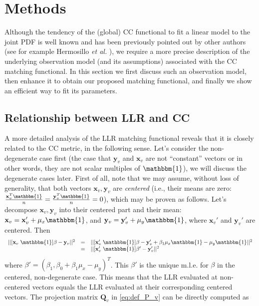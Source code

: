 \vspace{-0.5cm}
\section{Methods}
Although the tendency of the (global) CC functional to fit a linear model to the joint PDF is well known and has been previously pointed out by other authors (see for example Hermosillo {\it et al.} \cite{Hermosillo2004}), we require a more precise description of the underlying observation model (and its assumptions) associated with the CC matching functional. In this section we first discuss such an observation model, then enhance it to obtain our proposed matching functional, and finally we show an efficient way to fit its parameters.

\subsection{Relationship between LLR and CC}
A more detailed analysis of the LLR matching functional reveals that it is closely related to the CC metric, in the following sense. Let's consider the non-degenerate case first (the case that $\mathbf{y}_{v}$ and $\mathbf{x}_{v}$ are not ``constant'' vectors or in other words, they are not scalar multiples of $\mathbbm{1}$), we will discuss the degenerate cases later. First of all, note that we may assume, without loss of generality, that both vectors $\mathbf{x}_{v}, \mathbf{y}_{v}$ are \emph{centered} (i.e., their means are zero: $\frac{\mathbf{x}_{v}^{T}\mathbbm{1}}{n} = \frac{\mathbf{y}_{v}^{T}\mathbbm{1}}{n} = 0$), which may be proven as follows. Let's decompose $\mathbf{x}_{v}, \mathbf{y}_{v}$ into their centered part and their mean: $\mathbf{x}_{v} = \mathbf{x}_{v}' + \mu_{x}\mathbbm{1}$, and $\mathbf{y}_{v} = \mathbf{y}_{v}' + \mu_{y}\mathbbm{1}$, where $\mathbf{x}_{v}'$ and $\mathbf{y}_{v}'$ are centered. Then
\begin{displaymath}
    \begin{array}{lcl}
        ||[\mathbf{x}_{v} \; \mathbbm{1}]\beta - \mathbf{y}_{v}||^{2} &=& ||[\mathbf{x}_{v}' \; \mathbbm{1}]\beta - \mathbf{y}_{v}' + \beta_{1}\mu_{x}\mathbbm{1} - \mu_{y}\mathbbm{1}||^{2}\\
        &=&||[\mathbf{x}_{v}' \; \mathbbm{1}]\beta' - \mathbf{y}_{v}'||^{2}
    \end{array}
\end{displaymath}
where $\beta' = (\beta_{1}, \beta_{0} + \beta_{1}\mu_{x} - \mu_{y})^{T}$. This $\beta'$ is the unique m.l.e. for $\beta$ in the centered, non-degenerate case. This means that the LLR evaluated at non-centered vectors equals the LLR evaluated at their corresponding centered vectors. The projection matrix $\mathbf{Q}_{v}$ in \eqref{eq:def_P_v} can be directly computed as
